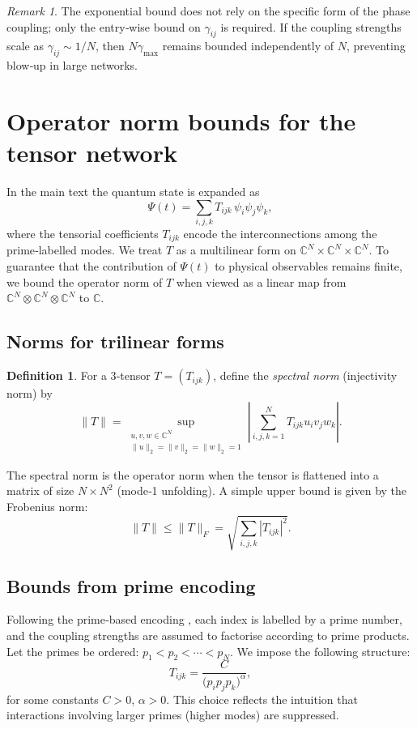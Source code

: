 \documentclass[11pt,a4paper]{article}
\theoremstyle{definition}
\newtheorem{definition}[theorem]{Definition}
\theoremstyle{remark}
\newtheorem{remark}[theorem]{Remark}
\newcommand{\C}{\mathbb{C}}
\newcommand{\norm}[1]{\|#1\|}
\begin{document}
\begin{remark}
The exponential bound does not rely on the specific form of the phase coupling; only the entry‑wise bound on \(\gamma_{ij}\) is required.  
If the coupling strengths scale as \(\gamma_{ij} \sim 1/N\), then \(N\gamma_{\max}\) remains bounded independently of \(N\), preventing blow‑up in large networks.
\end{remark}

\section{Operator norm bounds for the tensor network}
\label{sec:tensorbounds}

In the main text the quantum state is expanded as
\[
\Psi(t) = \sum_{i,j,k} T_{ijk}\, \psi_i \psi_j \psi_k,
\]
where the tensorial coefficients \(T_{ijk}\) encode the interconnections among the prime‑labelled modes.  
We treat \(T\) as a multilinear form on \(\C^N\times\C^N\times\C^N\).  
To guarantee that the contribution of \(\Psi(t)\) to physical observables remains finite, we bound the operator norm of \(T\) when viewed as a linear map from \(\C^N\otimes\C^N\otimes\C^N\) to \(\C\).

\subsection{Norms for trilinear forms}
\begin{definition}
For a 3‑tensor \(T = (T_{ijk})\), define the \emph{spectral norm} (injectivity norm) by
\[
\norm{T} = \sup_{\substack{u,v,w\in\C^N\\ \|u\|_2=\|v\|_2=\|w\|_2=1}} \left|\sum_{i,j,k=1}^N T_{ijk} u_i v_j w_k\right|.
\]
\end{definition}
The spectral norm is the operator norm when the tensor is flattened into a matrix of size \(N\times N^2\) (mode‑1 unfolding).  
A simple upper bound is given by the Frobenius norm:
\[
\norm{T} \le \|T\|_F = \sqrt{\sum_{i,j,k} |T_{ijk}|^2}.
\]

\subsection{Bounds from prime encoding}
Following the prime‑based encoding \cite{VanGelder2026}, each index is labelled by a prime number, and the coupling strengths are assumed to factorise according to prime products.  
Let the primes be ordered: \(p_1<p_2<\cdots<p_N\).  
We impose the following structure:
\[
T_{ijk} = \frac{C}{\bigl(p_i p_j p_k\bigr)^\alpha},
\]
for some constants \(C>0\), \(\alpha>0\).  
This choice reflects the intuition that interactions involving larger primes (higher modes) are suppressed.
\end{document}
